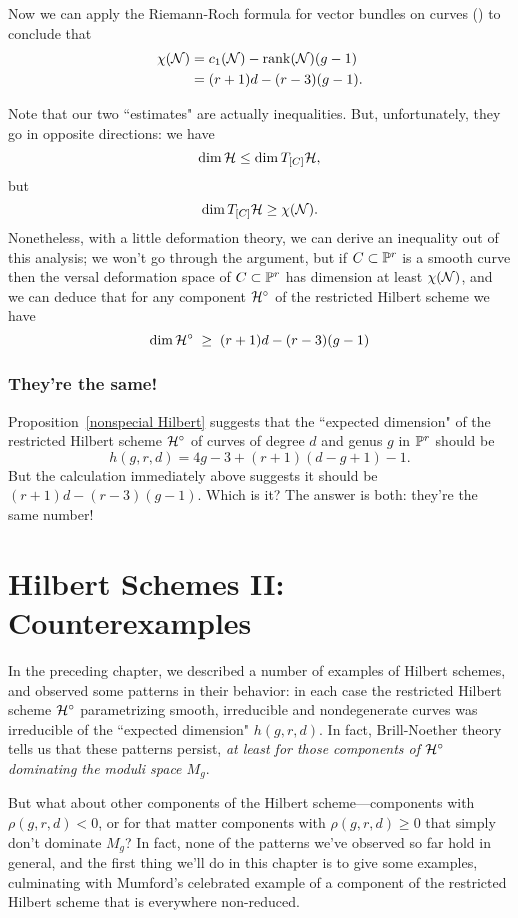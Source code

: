 Now we can apply the Riemann-Roch formula for vector bundles on curves (\cite{3264}) to conclude that
\begin{align*}
\chi(\cN) &= c_1(\cN) - \rank(\cN)(g-1) \\
&= (r+1)d - (r-3)(g-1).
\end{align*}

Note that our two ``estimates" are actually inequalities. But, unfortunately, they go in opposite directions: we have
$$
\dim \cH \leq \dim T_{[C]}\cH,
$$
but 
$$
\dim T_{[C]}\cH \geq \chi(\cN).
$$
Nonetheless, with a little deformation theory, we can derive an inequality out of this analysis; we won't go through the argument, but if $C \subset \PP^r$ is a smooth curve then the versal deformation space of $C \subset \PP^r$ has dimension at least $\chi(\cN)$, and we can deduce that for any component $\cH^\circ$ of the restricted Hilbert scheme we have
$$
\dim \cH^\circ \; \geq \; (r+1)d - (r-3)(g-1)
$$


\subsection{They're the same!} Proposition~\ref{nonspecial Hilbert} suggests that the ``expected dimension" of the restricted Hilbert scheme $\cH^\circ$ of curves of degree $d$ and genus $g$ in $\PP^r$ should be 
$$
h(g,r,d) = 4g-3 + (r+1)(d-g+1) - 1.
$$
But the calculation immediately above suggests it should be $(r+1)d - (r-3)(g-1)$. Which is it? The answer is both: they're the same number!

\chapter{Hilbert Schemes II: Counterexamples} 

In the preceding chapter, we described a number of examples of Hilbert schemes, and observed some patterns in their behavior: in each case the restricted Hilbert scheme $\cH^\circ$ parametrizing smooth, irreducible and nondegenerate curves was irreducible of the ``expected dimension" $h(g,r,d)$. In fact, Brill-Noether theory tells us that these patterns persist, \emph{at least for those components of $\cH^\circ$ dominating the moduli space $M_g$}.

But what about other components of the Hilbert scheme---components with $\rho(g,r,d) < 0$, or for that matter components with $\rho(g,r,d) \geq 0$ that simply don't dominate $M_g$? In fact, none of the patterns we've observed so far hold in general, and the first thing we'll do in this chapter is to give some examples, culminating with Mumford's celebrated example of a component of the restricted Hilbert scheme that is everywhere non-reduced.

